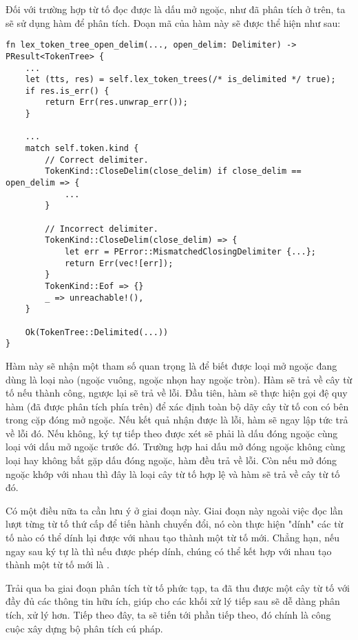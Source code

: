     Đối với trường hợp từ tố đọc được là dấu mở ngoặc, như đã phân tích ở trên, ta sẽ sử dụng hàm  để phân tích. Đoạn mã của hàm này sẽ được thể hiện như sau:

\begin{lstlisting}[]
fn lex_token_tree_open_delim(..., open_delim: Delimiter) -> PResult<TokenTree> {
    ...
    let (tts, res) = self.lex_token_trees(/* is_delimited */ true);
    if res.is_err() {
        return Err(res.unwrap_err());
    }

    ...
    match self.token.kind {
        // Correct delimiter.
        TokenKind::CloseDelim(close_delim) if close_delim == open_delim => {
            ...
        }

        // Incorrect delimiter.
        TokenKind::CloseDelim(close_delim) => {
            let err = PError::MismatchedClosingDelimiter {...};
            return Err(vec![err]);
        }
        TokenKind::Eof => {}
        _ => unreachable!(),
    }

    Ok(TokenTree::Delimited(...))
}
\end{lstlisting}

    Hàm này sẽ nhận một tham số quan trọng là  để biết được loại mở ngoặc đang dùng là loại nào (ngoặc vuông, ngoặc nhọn hay ngoặc tròn). Hàm sẽ trả về cây từ tố nếu thành công, ngược lại sẽ trả về lỗi. Đầu tiên, hàm sẽ thực hiện gọi đệ quy hàm  (đã được phân tích phía trên) để xác định toàn bộ dãy cây từ tố con có bên trong cặp đóng mở ngoặc. Nếu kết quả nhận được là lỗi, hàm sẽ ngay lập tức trả về lỗi đó. Nếu không, ký tự tiếp theo được xét sẽ phải là dấu đóng ngoặc cùng loại với dấu mở ngoặc trước đó. Trường hợp hai dấu mở đóng ngoặc không cùng loại hay không bắt gặp dấu đóng ngoặc, hàm đều trả về lỗi. Còn nếu mở đóng ngoặc khớp với nhau thì đây là loại cây từ tố  hợp lệ và hàm sẽ trả về cây từ tố đó.

    Có một điều nữa ta cần lưu ý ở giai đoạn này. Giai đoạn này ngoài việc đọc lần lượt từng từ tố thứ cấp để tiến hành chuyển đổi, nó còn thực hiện "dính" các từ tố nào có thể dính lại được với nhau tạo thành một từ tố mới. Chẳng hạn, nếu ngay sau ký tự \kw{<} là \kw{=} thì nếu được phép dính, chúng có thể kết hợp với nhau tạo thành một từ tố mới là \kw{<=}. 

    Trải qua ba giai đoạn phân tích từ tố phức tạp, ta đã thu được một cây từ tố với đầy đủ các thông tin hữu ích, giúp cho các khối xử lý tiếp sau sẽ dễ dàng phân tích, xử lý hơn. Tiếp theo đây, ta sẽ tiến tới phần tiếp theo, đó chính là công cuộc xây dựng bộ phân tích cú pháp.

